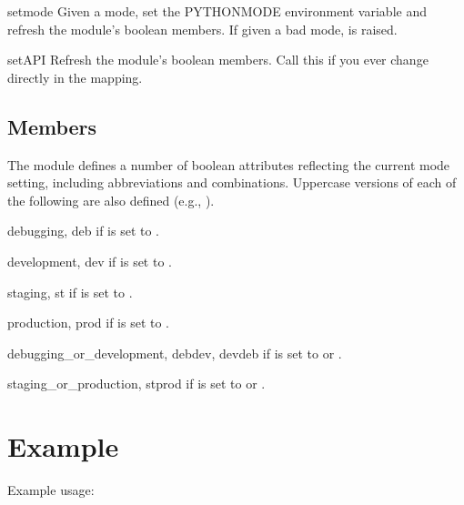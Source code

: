 \documentclass{manual}
\begin{document}
\begin{funcdesc}{set}{mode}
Given a mode, set the PYTHONMODE environment variable and refresh the module's
boolean members. If given a bad mode,  is raised.
\end{funcdesc}

\begin{funcdesc}{setAPI}{}
Refresh the module's boolean members. Call this if you ever change
 directly in the  mapping.
\end{funcdesc}

\section{Members}

The module defines a number of boolean attributes reflecting the current mode
setting, including abbreviations and combinations. Uppercase versions of each of
the following are also defined (e.g., ).

\begin{datadesc}{debugging, deb}
 if  is set to .
\end{datadesc}
\begin{datadesc}{development, dev}
 if  is set to .
\end{datadesc}
\begin{datadesc}{staging, st}
 if  is set to .
\end{datadesc}
\begin{datadesc}{production, prod}
 if  is set to .
\end{datadesc}
\begin{datadesc}{debugging_or_development, debdev, devdeb}
 if  is set to  or .
\end{datadesc}
\begin{datadesc}{staging_or_production, stprod}
 if  is set to  or .
\end{datadesc}


\chapter{Example}

Example usage:
\end{document}
